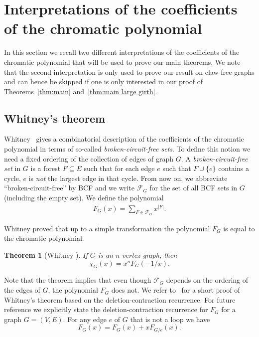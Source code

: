\documentclass[a4paper,11pt,reqno]{amsart}
\newtheorem{theorem}[corollary]{Theorem}
\numberwithin{equation}{section}
\begin{document}
\section{Interpretations of the coefficients of the chromatic polynomial} 
In this section we recall two different interpretations of the coefficients of the chromatic polynomial that will be used to prove our main theorems. 
We note that the second interpretation is only used to prove our result on claw-free graphs and can hence be skipped if one is only interested in our proof of Theorems~\ref{thm:main} and~\ref{thm:main large girth}.
\subsection{Whitney's theorem}
Whitney~\cite{Whitney} gives a combinatorial description of the coefficients of the chromatic polynomial in terms of so-called \emph{broken-circuit-free sets}. 
To define this notion we need a fixed ordering of the collection of edges of graph $G$.
A \emph{broken-circuit-free set} in $G$ is a forest $F \subseteq E$ such that for each edge $e$ such that $F\cup \{e\}$ contains a cycle, $e$ is \emph{not} the largest edge in that cycle.
From now on, we abbreviate ``broken-circuit-free'' by BCF and we write $\mathcal{F}_G$ for the set of all BCF sets in $G$ (including the empty set). 
We define the polynomial
 \begin{align}\label{eq:FGDef}
     F_G(x) = \sum_{F \in \mathcal{F}_G}x^{|F|}.
 \end{align}


Whitney proved that up to a simple transformation the polynomial $F_G$ is equal to the chromatic polynomial.
\begin{theorem}[Whitney \cite{Whitney}]\label{thm:whitney}
If $G$ is an $n$-vertex graph, then 
\[
\chi_G(x) = x^nF_G(-1/x). 
\]
\end{theorem}
Note that the theorem implies that even though $\mathcal{F}_G$ depends on the ordering of the edges of $G$, the polynomial $F_G$ does not.
We refer to~\cite{JPR24} for a short proof of Whitney's theorem based on the deletion-contraction recurrence.
For future reference we explicitly state the deletion-contraction recurrence for $F_G$ for a graph $G=(V,E)$. For any edge $e$ of $G$ that is not a loop we have
\begin{equation}\label{eq:deletion/contraction F}
    F_G(x)=F_G(x)+xF_{G/e}(x).
\end{equation}
\end{document}
